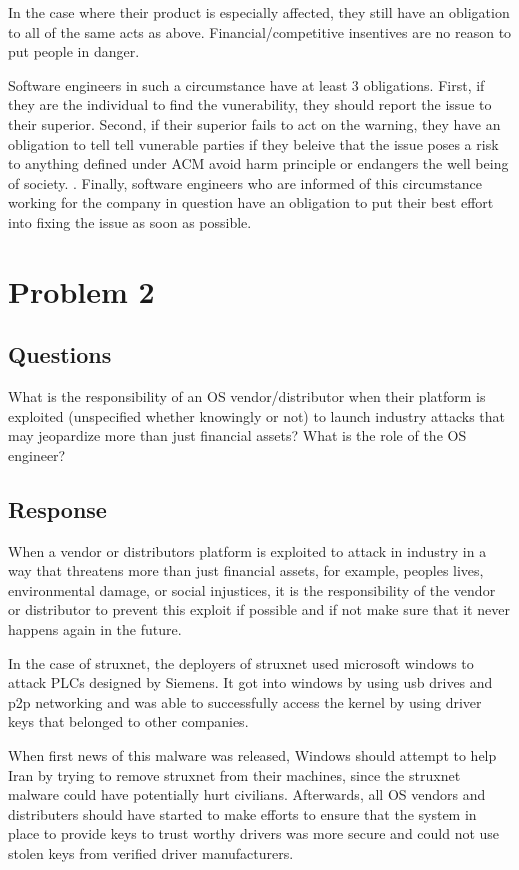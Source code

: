 \documentclass{assignment-x}
\begin{document}
In the case where their product is especially affected, they still have an obligation to all of the same acts as above. Financial/competitive insentives are no reason to put people in danger.

Software engineers in such a circumstance have at least 3 obligations. First, if they are the individual to find the vunerability, they should report the issue to their superior. Second, if their superior fails to act on the warning, they have an obligation to tell tell vunerable parties if they beleive that the issue poses a risk to anything defined under ACM avoid harm principle or endangers the well being of society. \cite{ACMCodeOfEthics}. Finally, software engineers who are informed of this circumstance working for the company in question have an obligation to put their best effort into fixing the issue as soon as possible.

\section{Problem 2}
\subsection{Questions}
What is the responsibility of an OS vendor/distributor when their platform is exploited (unspecified whether knowingly or not) to launch industry attacks that may jeopardize more than just financial assets?
What is the role of the OS engineer?
\subsection{Response}
When a vendor or distributors platform is exploited to attack in industry in a way that threatens more than just financial assets, for example, peoples lives, environmental damage, or social injustices, it is the responsibility of the vendor or distributor to prevent this exploit if possible and if not make sure that it never happens again in the future. 

In the case of struxnet, the deployers of struxnet used microsoft windows to attack PLCs designed by Siemens. It got into windows by using usb drives and p2p networking and was able to successfully access the kernel by using driver keys that belonged to other companies. \cite{stuxnet_wikipedia}

When first news of this malware was released, Windows should attempt to help Iran by trying to remove struxnet from their machines, since the struxnet malware could have potentially hurt civilians. Afterwards, all OS vendors and distributers should have started to make efforts to ensure that the system in place to provide keys to trust worthy drivers was more secure and could not use stolen keys from verified driver manufacturers.
\end{document}
